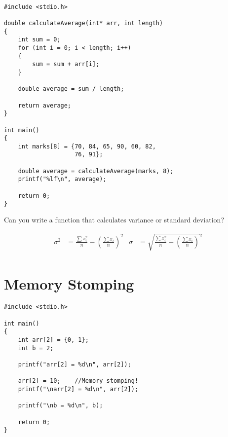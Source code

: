 \documentclass[12pt]{article}
\begin{document}
\begin{verbatim}

#include <stdio.h>

double calculateAverage(int* arr, int length)
{
    int sum = 0;
    for (int i = 0; i < length; i++)
    {
        sum = sum + arr[i];
    }

    double average = sum / length;

    return average;
}

int main()
{
    int marks[8] = {70, 84, 65, 90, 60, 82, 
                    76, 91};

    double average = calculateAverage(marks, 8);
    printf("%lf\n", average);

    return 0;
}

\end{verbatim}

\newpage
\noindent Can you write a function that calculates variance or standard deviation?

\begin{align*}
    \sigma^2 &= \frac{\sum x_i ^2}{n} - \left(\frac{\sum x_i}{n} \right)^2 & \sigma &= \sqrt{\frac{\sum x_i ^2}{n} - \left(\frac{\sum x_i}{n} \right)^2}\\
\end{align*}














\newpage
{}
\section*{Memory Stomping}

\begin{verbatim}
#include <stdio.h>

int main()
{
	int arr[2] = {0, 1};
	int b = 2;
	
	printf("arr[2] = %d\n", arr[2]);
	
	arr[2] = 10;    //Memory stomping!
	printf("\narr[2] = %d\n", arr[2]);
	
	printf("\nb = %d\n", b);
	
	return 0;
}
\end{verbatim}
\end{document}
